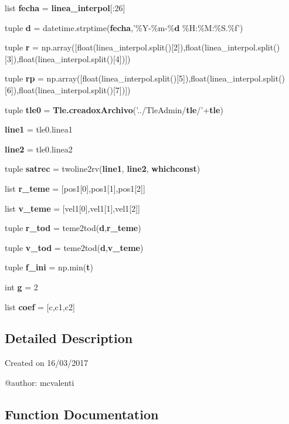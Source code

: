 \begin{DoxyCompactItemize}
\item 
list {\bf fecha} = {\bf linea\-\_\-interpol}[\-:26]
\item 
tuple {\bf d} = datetime.\-strptime({\bf fecha},'\%\-Y-\/\%m-\/\%{\bf d} \%\-H\-:\%\-M\-:\%\-S.\%f')
\item 
tuple {\bf r} = np.\-array([float(linea\-\_\-interpol.\-split()[2]),float(linea\-\_\-interpol.\-split()[3]),float(linea\-\_\-interpol.\-split()[4])])
\item 
tuple {\bf rp} = np.\-array([float(linea\-\_\-interpol.\-split()[5]),float(linea\-\_\-interpol.\-split()[6]),float(linea\-\_\-interpol.\-split()[7])])
\item 
tuple {\bf tle0} = {\bf \-Tle.\-creadox\-Archivo}('../\-Tle\-Admin/{\bf tle}/'+{\bf tle})
\item 
{\bf line1} = tle0.\-linea1
\item 
{\bf line2} = tle0.\-linea2
\item 
tuple {\bf satrec} = twoline2rv({\bf line1}, {\bf line2}, {\bf whichconst})
\item 
list {\bf r\-\_\-teme} = [pos1[0],pos1[1],pos1[2]]
\item 
list {\bf v\-\_\-teme} = [vel1[0],vel1[1],vel1[2]]
\item 
tuple {\bf r\-\_\-tod} = teme2tod({\bf d},{\bf r\-\_\-teme})
\item 
tuple {\bf v\-\_\-tod} = teme2tod({\bf d},{\bf v\-\_\-teme})
\item 
tuple {\bf f\-\_\-ini} = np.\-min({\bf t})
\item 
int {\bf g} = 2
\item 
list {\bf coef} = [c,c1,c2]
\end{DoxyCompactItemize}


\subsection{\-Detailed \-Description}
\begin{DoxyVerb}
Created on 16/03/2017

@author: mcvalenti
\end{DoxyVerb}
 

\subsection{\-Function \-Documentation}
